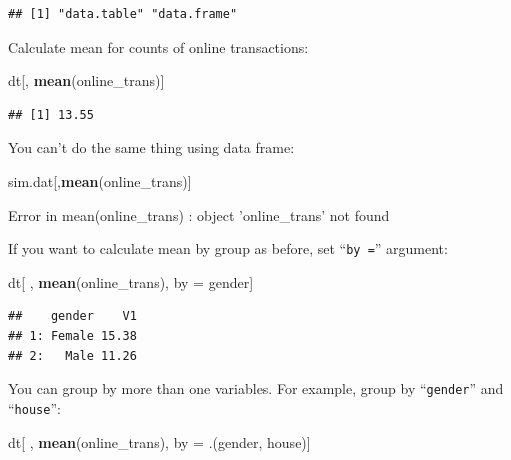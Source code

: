 \documentclass[12pt,]{krantz}
\makeatletter
\newenvironment{Shaded}{\begin{snugshade}}{\end{snugshade}}
\newcommand{\KeywordTok}[1]{\textcolor[rgb]{0.27,0.27,0.27}{\textbf{#1}}}
\newcommand{\NormalTok}[1]{#1}
\newcommand{\StringTok}[1]{\textcolor[rgb]{0.5,0.5,0.5}{#1}}
\newenvironment{kframe}{%
\medskip{}
\setlength{\fboxsep}{.8em}
 \def\at@end@of@kframe{}%
 \ifinner\ifhmode%
  \def\at@end@of@kframe{\end{minipage}}%
  \begin{minipage}{\columnwidth}%
 \fi\fi%
 \def\FrameCommand##1{\hskip\@totalleftmargin \hskip-\fboxsep
 \colorbox{shadecolor}{##1}\hskip-\fboxsep
     \hskip-\linewidth \hskip-\@totalleftmargin \hskip\columnwidth}%
 \MakeFramed {\advance\hsize-\width
   \@totalleftmargin\z@ \linewidth\hsize
   \@setminipage}}%
 {\par\unskip\endMakeFramed%
 \at@end@of@kframe}
\renewenvironment{Shaded}{\begin{kframe}}{\end{kframe}}
\makeatother
\begin{document}
\begin{verbatim}
## [1] "data.table" "data.frame"
\end{verbatim}

Calculate mean for counts of online transactions:

\begin{Shaded}
\begin{Highlighting}[]
\NormalTok{dt[, }\KeywordTok{mean}\NormalTok{(online_trans)]}
\end{Highlighting}
\end{Shaded}

\begin{verbatim}
## [1] 13.55
\end{verbatim}

You can't do the same thing using data frame:

\begin{Shaded}
\begin{Highlighting}[]
\NormalTok{sim.dat[,}\KeywordTok{mean}\NormalTok{(online_trans)]}
\end{Highlighting}
\end{Shaded}

\begin{Shaded}
\begin{Highlighting}[]
\NormalTok{Error in mean(online_trans) : object 'online_trans' not found}
\end{Highlighting}
\end{Shaded}

If you want to calculate mean by group as before, set ``\texttt{by\ =}'' argument:

\begin{Shaded}
\begin{Highlighting}[]
\NormalTok{dt[ , }\KeywordTok{mean}\NormalTok{(online_trans), by =}\StringTok{ }\NormalTok{gender]}
\end{Highlighting}
\end{Shaded}

\begin{verbatim}
##    gender    V1
## 1: Female 15.38
## 2:   Male 11.26
\end{verbatim}

You can group by more than one variables. For example, group by ``\texttt{gender}'' and ``\texttt{house}'':

\begin{Shaded}
\begin{Highlighting}[]
\NormalTok{dt[ , }\KeywordTok{mean}\NormalTok{(online_trans), by =}\StringTok{ }\NormalTok{.(gender, house)]}
\end{Highlighting}
\end{Shaded}
\end{document}
